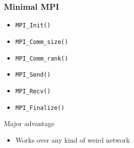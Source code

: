 \documentclass[xcolor={x11names,svgnames,psnames}]{beamer}
\begin{document}
\begin{frame}
  \frametitle{Minimal MPI}

  \begin{itemize}
  \item \texttt{MPI_Init()}
  \item \texttt{MPI_Comm_size()}
  \item \texttt{MPI_Comm_rank()}
  \item \texttt{MPI_Send()}
  \item \texttt{MPI_Recv()}    
  \item \texttt{MPI_Finalize()}
  \end{itemize}

  \begin{alertblock}{Major advantage}
    \begin{itemize}
    \item Works over any kind of weird network
    \end{itemize}
  \end{alertblock}
\end{frame}

\end{document}
